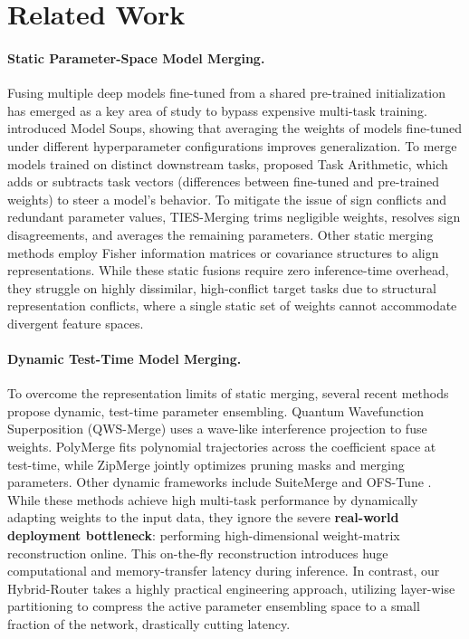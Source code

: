 \section{Related Work}
\label{sec:related_work}

\paragraph{Static Parameter-Space Model Merging.}
Fusing multiple deep models fine-tuned from a shared pre-trained initialization has emerged as a key area of study to bypass expensive multi-task training. \citet{wortsman2022model} introduced Model Soups, showing that averaging the weights of models fine-tuned under different hyperparameter configurations improves generalization. To merge models trained on distinct downstream tasks, \citet{ilharco2022editing} proposed Task Arithmetic, which adds or subtracts task vectors (differences between fine-tuned and pre-trained weights) to steer a model's behavior. To mitigate the issue of sign conflicts and redundant parameter values, TIES-Merging \cite{yadav2023ties} trims negligible weights, resolves sign disagreements, and averages the remaining parameters. Other static merging methods employ Fisher information matrices \cite{matena2022merging} or covariance structures \cite{adamerging} to align representations. While these static fusions require zero inference-time overhead, they struggle on highly dissimilar, high-conflict target tasks due to structural representation conflicts, where a single static set of weights cannot accommodate divergent feature spaces.

\paragraph{Dynamic Test-Time Model Merging.}
To overcome the representation limits of static merging, several recent methods propose dynamic, test-time parameter ensembling. Quantum Wavefunction Superposition (QWS-Merge) \cite{qwsmerge} uses a wave-like interference projection to fuse weights. PolyMerge \cite{polymerge} fits polynomial trajectories across the coefficient space at test-time, while ZipMerge \cite{zipmerge} jointly optimizes pruning masks and merging parameters. Other dynamic frameworks include SuiteMerge \cite{suitemerge} and OFS-Tune \cite{ofstune}. 
While these methods achieve high multi-task performance by dynamically adapting weights to the input data, they ignore the severe \textbf{real-world deployment bottleneck}: performing high-dimensional weight-matrix reconstruction online. This on-the-fly reconstruction introduces huge computational and memory-transfer latency during inference. In contrast, our Hybrid-Router takes a highly practical engineering approach, utilizing layer-wise partitioning to compress the active parameter ensembling space to a small fraction of the network, drastically cutting latency.

